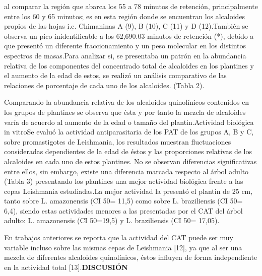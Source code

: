 \documentclass{article}
\begin{document}
{al comparar la región que abarca los 55 a 78 minutos de retención, principalmente entre los 60 y 65 minutos; es en esta región donde se encuentran los alcaloides propios de las hojas i.e. Chimaninas A (9), B (10), C (11) y D (12).}{También se observa un pico inidentificable a los 62,690.03 minutos de retención (*), debido a que presentó un diferente fraccionamiento y un peso molecular en los distintos espectros de masas.}{Para analizar si, se presentaba un patrón en la abundancia relativa de los componentes del concentrado total de alcaloides en los plantines y el aumento de la edad de estos, se realizó un análisis comparativo de las relaciones de porcentaje de cada uno de los alcaloides. (Tabla 2).}\begin{Center}\end{Center}{Comparando la abundancia relativa de los alcaloides quinolínicos contenidos en los grupos de plantines se observa que ésta y por tanto la mezcla de alcaloides varía de acuerdo al aumento de la edad o tamaño del plantin.}{Actividad biológica in vitro}{Se evaluó la actividad antiparasitaria de los PAT de los grupos A, B y C, sobre promastigotes de Leishmania, los resultados muestran fluctuaciones consideradas dependientes de la edad de éstos y las proporciones relativas de los alcaloides en cada uno de estos plantines. No se observan diferencias significativas entre ellos, sin embargo, existe una diferencia marcada respecto al árbol adulto (Tabla 3) presentando los plantines una mejor actividad biológica frente a las cepas Leishmania estudiadas.}{La mejor actividad la presentó el plantin de 25 cm, tanto sobre L. amazonensis (CI 50= 11,5) como sobre L. braziliensis (CI 50= 6,4), siendo estas actividades menores a las presentadas por el CAT del árbol adulto: L. amazonensis (CI 50=19,5) y L. braziliensis (CI 50= 17,05).}\begin{Center}\end{Center}{En trabajos anteriores se reporta que la actividad del CAT puede ser muy variable incluso sobre las mismas cepas de Leishmania [12], ya que al ser una mezcla de diferentes alcaloides quinolínicos, éstos influyen de forma independiente en la actividad total [13].}{\textbf{DISCUSIÓN}
}
\end{document}
